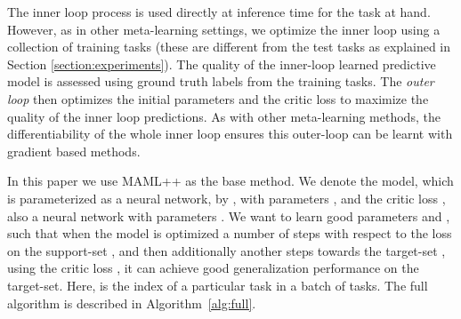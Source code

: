 \documentclass{article} \usepackage[dvipsnames]{xcolor}
\begin{document}
The inner loop process is used directly at inference time for the task at hand. However, as in other meta-learning settings, we optimize the inner loop using a collection of training tasks (these are different from the test tasks as explained in Section \ref{section:experiments}).
The quality of the inner-loop learned predictive model is assessed using ground truth labels from the training tasks. The \emph{outer loop} then optimizes the initial parameters and the critic loss to maximize the quality of the inner loop predictions. As with other meta-learning methods, the differentiability of the whole inner loop ensures this outer-loop can be learnt with gradient based methods.








In this paper we use MAML++ as the base method. We denote the model, which is parameterized as a neural network, by , with parameters , and the critic loss , also a neural network with parameters . We want to learn good parameters  and , such that when the model  is optimized a number of steps  with respect to the loss  on the support-set , and then additionally another  steps towards the target-set , using the critic loss , it can achieve good generalization performance on the target-set. Here,  is the index of a particular task in a batch of tasks.  The full algorithm is described in Algorithm~\ref{alg:full}.


\begin{comment}
The updated base-network parameters after  steps on data from the support task  be expressed with Equation \ref{equation:inner_support_update}, where  is the learning rate,  are the base-network weights after  steps towards task ,  is the loss on the support-set of task  after  (i.e. the previous step) update steps.
\end{comment}
\end{document}
